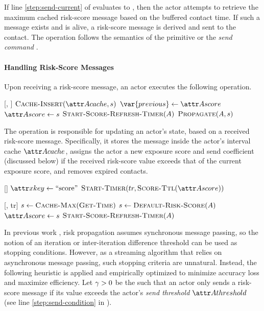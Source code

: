 If line \ref{step:send-current} of \cSendCurrentOrCached[] evaluates to \false, then the actor attempts to retrieve the maximum cached risk-score message based on the buffered contact time. If such a message exists and is alive, a risk-score message is derived and sent to the contact. The \cSend[] operation follows the semantics of the  primitive \cite{AghaThesis1985, Agha1990} or the \emph{send command} \cite{Agha1985}.

\paragraph{Handling Risk-Score Messages}

Upon receiving a risk-score message, an actor executes the following operation.
%
\begin{function}{\nHandleScoreMessage}[\vActor, \vScore]
    \State $\cCacheInsert[\aActorCache, \vScore]$
    \If{$\aScoreValue > \aActorScoreValue$}
    	\State $\var{previous} \assign \aActorScore$
    	\State $\aActorScore \assign \vScore$
    		\State $\cStartScoreRefreshTimer[\vActor]$
    	\EndIf
    \EndIf
    \State $\cPropagate[\vActor, \vScore]$
\end{function}
%
The  operation is responsible for updating an actor's state, based on a received risk-score message. Specifically, it stores the message inside the actor's interval cache $\aActorCache$, assigns the actor a new exposure score and send coefficient (discussed below) if the received risk-score value exceeds that of the current exposure score, and removes expired contacts.
%
\begin{function}{\nStartScoreRefreshTimer}[\vActor]
    \State $\aTimerKey \assign \text{``score''}$
    \State $\cStartTimer[tr, \cScoreTtl[\aActorScore]]$
\end{function}
\begin{function}{\nHandleScoreRefreshTimer}[\vActor, tr]
    \State $\vScore \assign \cCacheMax[\cGetTime]$
    \If{$\vScore \equals \nil$}
    	\State $\vScore \assign \cDefaultScore[\vActor]$
    \EndIf
    \State $\aActorScore \assign \vScore$
    \If{$\vScore \notEquals \cDefaultScore[\vActor]$}
    	\State $\cStartScoreRefreshTimer[\vActor]$
    \EndIf
\end{function}
%
In previous work \cite{Ayday2021}, risk propagation assumes synchronous message passing, so the notion of an iteration or inter-iteration difference threshold can be used as stopping conditions. However, as a streaming algorithm that relies on asynchronous message passing, such stopping criteria are unnatural. Instead, the following heuristic is applied and empirically optimized to minimize accuracy loss and maximize efficiency. Let $\gamma > 0$ be the  such that an actor only sends a risk-score message if its value exceeds the actor's \emph{send threshold} $\aThreshold{\vActor}$ (see line \ref{step:send-condition} in \cPropagate).

